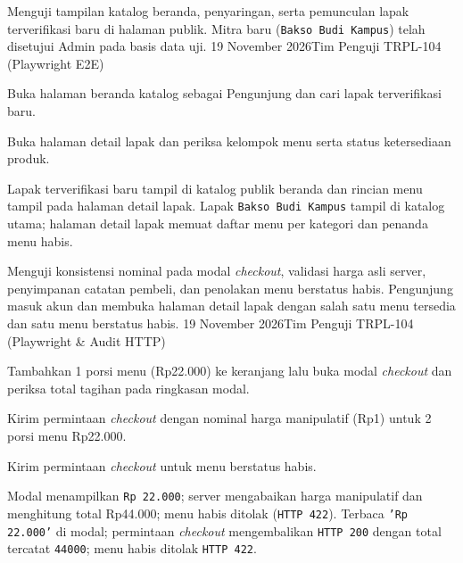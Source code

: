 {Menguji tampilan katalog beranda, penyaringan, serta pemunculan lapak terverifikasi baru di halaman publik.}
{Mitra baru (\texttt{Bakso Budi Kampus}) telah disetujui Admin pada basis data uji.}
{19 November 2026}{Tim Penguji TRPL-104 (Playwright E2E)}
{\begin{uclist}
  \item Buka halaman beranda katalog sebagai Pengunjung dan cari lapak terverifikasi baru.
  \item Buka halaman detail lapak dan periksa kelompok menu serta status ketersediaan produk.
\end{uclist}}
{Lapak terverifikasi baru tampil di katalog publik beranda dan rincian menu tampil pada halaman detail lapak.}
{Lapak \texttt{Bakso Budi Kampus} tampil di katalog utama; halaman detail lapak memuat daftar menu per kategori dan penanda menu habis.}

{Menguji konsistensi nominal pada modal \textit{checkout}, validasi harga asli server, penyimpanan catatan pembeli, dan penolakan menu berstatus habis.}
{Pengunjung masuk akun dan membuka halaman detail lapak dengan salah satu menu tersedia dan satu menu berstatus habis.}
{19 November 2026}{Tim Penguji TRPL-104 (Playwright \& Audit HTTP)}
{\begin{uclist}
  \item Tambahkan 1 porsi menu (Rp22.000) ke keranjang lalu buka modal \textit{checkout} dan periksa total tagihan pada ringkasan modal.
  \item Kirim permintaan \textit{checkout} dengan nominal harga manipulatif (Rp1) untuk 2 porsi menu Rp22.000.
  \item Kirim permintaan \textit{checkout} untuk menu berstatus habis.
\end{uclist}}
{Modal menampilkan \texttt{Rp 22.000}; server mengabaikan harga manipulatif dan menghitung total Rp44.000; menu habis ditolak (\texttt{HTTP 422}).}
{Terbaca \texttt{'Rp 22.000'} di modal; permintaan \textit{checkout} mengembalikan \texttt{HTTP 200} dengan total tercatat \texttt{44000}; menu habis ditolak \texttt{HTTP 422}.}

